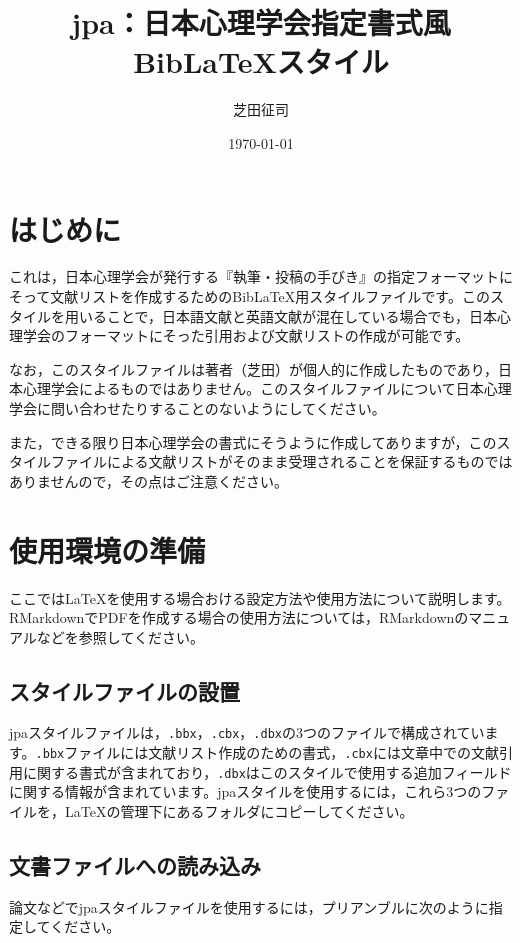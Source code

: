 \documentclass[a4paper]{jlreq}
\title{jpa：日本心理学会指定書式風\\[.5\zh]Bib{\LaTeX}スタイル}
\author{芝田征司}
\date{\today}
\begin{document}
\maketitle
\clearpage
\tableofcontents
\clearpage

\section*{はじめに}

これは，日本心理学会が発行する『執筆・投稿の手びき』の指定フォーマットにそって文献リストを作成するためのBib{\LaTeX}用スタイルファイルです。このスタイルを用いることで，日本語文献と英語文献が混在している場合でも，日本心理学会のフォーマットにそった引用および文献リストの作成が可能です。

なお，このスタイルファイルは著者（芝田）が個人的に作成したものであり，日本心理学会によるものではありません。このスタイルファイルについて日本心理学会に問い合わせたりすることのないようにしてください。

また，できる限り日本心理学会の書式にそうように作成してありますが，このスタイルファイルによる文献リストがそのまま受理されることを保証するものではありませんので，その点はご注意ください。

\section{使用環境の準備}

ここでは{\LaTeX}を使用する場合おける設定方法や使用方法について説明します。RMarkdownでPDFを作成する場合の使用方法については，RMarkdownのマニュアルなどを参照してください。

\subsection{スタイルファイルの設置}
jpaスタイルファイルは，\texttt{.bbx}，\texttt{.cbx}，\texttt{.dbx}の3つのファイルで構成されています。\texttt{.bbx}ファイルには文献リスト作成のための書式，\texttt{.cbx}には文章中での文献引用に関する書式が含まれており，\texttt{.dbx}はこのスタイルで使用する追加フィールドに関する情報が含まれています。jpaスタイルを使用するには，これら3つのファイルを，{\LaTeX}の管理下にあるフォルダにコピーしてください。



\subsection{文書ファイルへの読み込み}
論文などでjpaスタイルファイルを使用するには，プリアンブルに次のように指定してください。
\end{document}
